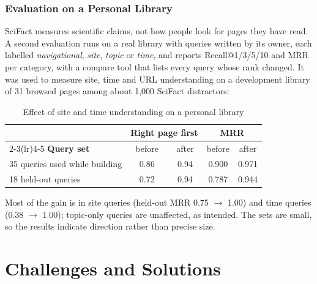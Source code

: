 \subsubsection{Evaluation on a Personal Library}

SciFact measures scientific claims, not how people look for pages they have
read. A second evaluation runs on a real library with queries written by its
owner, each labelled \emph{navigational}, \emph{site}, \emph{topic} or
\emph{time}, and reports Recall@1/3/5/10 and MRR per category, with a
compare tool that lists every query whose rank changed. It was used to
measure site, time and URL understanding on a development library of 31
browsed pages among about 1{,}000 SciFact distractors:

\begin{table}[H]
\centering
\small
\begin{tabular}{lcccc}
\toprule
& \multicolumn{2}{c}{\textbf{Right page first}} & \multicolumn{2}{c}{\textbf{MRR}} \\
\cmidrule(lr){2-3}\cmidrule(lr){4-5}
\textbf{Query set} & before & after & before & after \\
\midrule
35 queries used while building & 0.86 & 0.94 & 0.900 & 0.971 \\
18 held-out queries & 0.72 & 0.94 & 0.787 & 0.944 \\
\bottomrule
\end{tabular}
\caption{Effect of site and time understanding on a personal library}
\label{tab:personal}
\end{table}

Most of the gain is in site queries (held-out MRR 0.75 $\rightarrow$ 1.00)
and time queries (0.38 $\rightarrow$ 1.00); topic-only queries are
unaffected, as intended. The sets are small, so the results indicate
direction rather than precise size.

\section{Challenges and Solutions}

